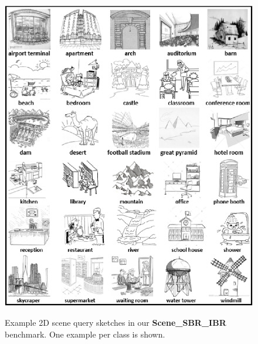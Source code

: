\documentclass[times, 10pt,twocolumn]{article}
\begin{document}
\begin{figure}[htb]
\centering
{
\includegraphics[width=1.0\linewidth]{SampleSketches}
}
\caption{Example 2D scene query sketches in our \textbf{Scene\_SBR\_IBR} benchmark. One example per class is shown.}
\label{BenchmarkSketchExamples}
\end{figure}
\end{document}
